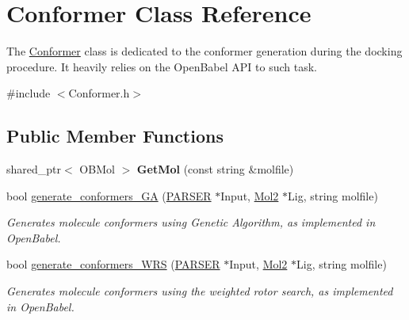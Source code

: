 \hypertarget{classConformer}{
\section{Conformer Class Reference}
\label{classConformer}
}


The \hyperlink{classConformer}{Conformer} class is dedicated to the conformer generation during the docking procedure. It heavily relies on the OpenBabel API to such task.  


{\ttfamily \#include $<$Conformer.h$>$}\subsection*{Public Member Functions}
\begin{DoxyCompactItemize}
\item 
\hypertarget{classConformer_a06ec3936e09d186872a13e484aa33d50}{
shared\_\-ptr$<$ OBMol $>$ {\bfseries GetMol} (const string \&molfile)}
\label{classConformer_a06ec3936e09d186872a13e484aa33d50}

\item 
\hypertarget{classConformer_a72dc33b0b1291bace2642cc96b51a906}{
bool \hyperlink{classConformer_a72dc33b0b1291bace2642cc96b51a906}{generate\_\-conformers\_\-GA} (\hyperlink{classPARSER}{PARSER} $\ast$Input, \hyperlink{classMol2}{Mol2} $\ast$Lig, string molfile)}
\label{classConformer_a72dc33b0b1291bace2642cc96b51a906}

\begin{DoxyCompactList}\small\item\em Generates molecule conformers using Genetic Algorithm, as implemented in OpenBabel. \item\end{DoxyCompactList}\item 
\hypertarget{classConformer_a429a2d0414b9270709761d7bc51f2d47}{
bool \hyperlink{classConformer_a429a2d0414b9270709761d7bc51f2d47}{generate\_\-conformers\_\-WRS} (\hyperlink{classPARSER}{PARSER} $\ast$Input, \hyperlink{classMol2}{Mol2} $\ast$Lig, string molfile)}
\label{classConformer_a429a2d0414b9270709761d7bc51f2d47}

\begin{DoxyCompactList}\small\item\em Generates molecule conformers using the weighted rotor search, as implemented in OpenBabel. \item\end{DoxyCompactList}\end{DoxyCompactItemize}


